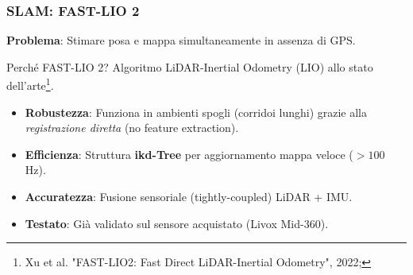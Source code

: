 \begin{frame}
    \frametitle{SLAM: FAST-LIO 2}
    \textbf{Problema}: Stimare posa e mappa simultaneamente in assenza di GPS.

    \vspace{0.5cm}
    \begin{block}{Perché FAST-LIO 2?}
        Algoritmo LiDAR-Inertial Odometry (LIO) allo stato dell'arte\footnote{Xu et al. "FAST-LIO2: Fast Direct LiDAR-Inertial Odometry", 2022;}.
        \begin{itemize}
            \item \textbf{Robustezza}: Funziona in ambienti spogli (corridoi lunghi) grazie alla \textit{registrazione diretta} (no feature extraction).
            \item \textbf{Efficienza}: Struttura \textbf{ikd-Tree} per aggiornamento mappa veloce ($>100$ Hz).
            \item \textbf{Accuratezza}: Fusione sensoriale (tightly-coupled) LiDAR + IMU.
            \item \textbf{Testato}: Già validato sul sensore acquistato (Livox Mid-360).
        \end{itemize}
    \end{block}
\end{frame}


